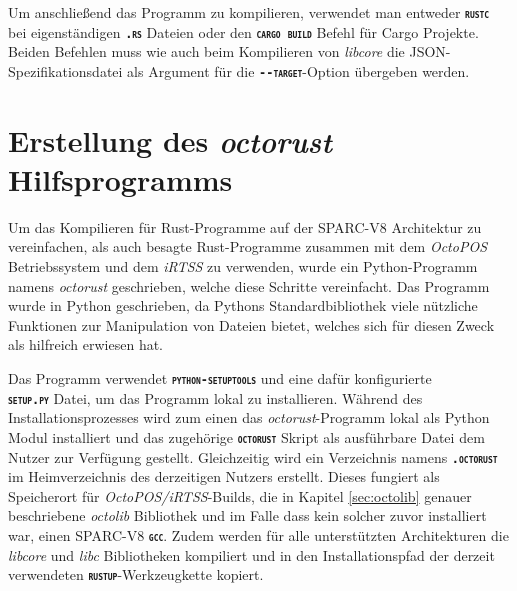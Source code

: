 Um anschließend das Programm zu kompilieren,
verwendet man entweder \texttt{\textsc{\textbf{rustc}}} bei eigenständigen
\texttt{\textsc{\textbf{.rs}}} Dateien oder den \texttt{\textsc{\textbf{cargo build}}} Befehl für Cargo Projekte.
Beiden Befehlen muss wie auch beim Kompilieren von \textit{libcore} die 
JSON-Spezifikationsdatei als Argument für die \texttt{\textsc{\textbf{-{}-target}}}-Option übergeben werden. 

\section{Erstellung des \textit{octorust} Hilfsprogramms}

Um das Kompilieren für Rust-Programme
auf der SPARC-V8 Architektur zu vereinfachen, als
auch besagte Rust-Programme zusammen mit dem \textit{OctoPOS} Betriebssystem und dem \textit{iRTSS} zu verwenden,
wurde ein Python-Programm namens \textit{octorust} geschrieben, welche diese Schritte
vereinfacht.
Das Programm wurde in Python geschrieben, da Pythons Standardbibliothek viele nützliche Funktionen zur Manipulation
von Dateien bietet, welches sich für diesen Zweck als hilfreich erwiesen hat.

Das Programm verwendet \texttt{\textsc{\textbf{python-setuptools}}} und eine dafür konfigurierte \\
\texttt{\textsc{\textbf{setup.py}}} Datei, um das Programm lokal zu installieren.
Während des Installationsprozesses wird zum einen das \textit{octorust}-Programm lokal als Python Modul 
installiert und das zugehörige \texttt{\textsc{\textbf{octorust}}} Skript als ausführbare Datei dem Nutzer zur 
Verfügung gestellt.
Gleichzeitig wird ein Verzeichnis namens \texttt{\textsc{\textbf{.octorust}}}
im Heimverzeichnis des derzeitigen Nutzers erstellt.
Dieses fungiert als Speicherort für \textit{OctoPOS/iRTSS}-Builds, die in Kapitel \ref{sec:octolib} genauer
beschriebene \textit{octolib} Bibliothek und im Falle dass kein solcher zuvor installiert war, einen SPARC-V8
\texttt{\textsc{\textbf{gcc}}}.
Zudem werden für alle unterstützten Architekturen die \textit{libcore} und \textit{libc} Bibliotheken
kompiliert und in den Installationspfad der derzeit verwendeten
\texttt{\textsc{\textbf{rustup}}}-Werkzeugkette kopiert.

